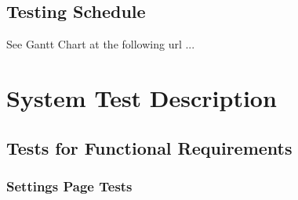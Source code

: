 \documentclass[12pt, titlepage]{article}
\begin{document}
	
	\subsection{Testing Schedule}
	
	See Gantt Chart at the following url ...
	
	\section{System Test Description}
	
	\subsection{Tests for Functional Requirements}
	\subsubsection{Settings Page Tests}
	
\end{document}
